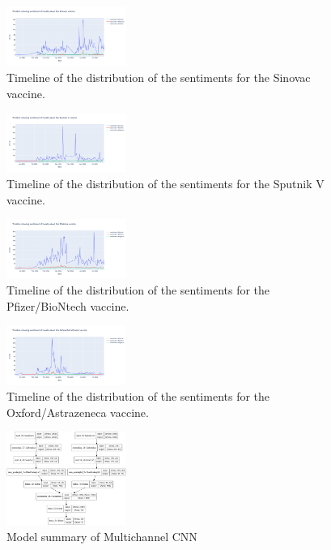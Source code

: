\documentclass[conference]{IEEEtran}
\begin{document}
\begin{figure}[h]
\centering
\includegraphics[width=0.35\textwidth]{sinovac.png}
\caption{Timeline of the distribution of the sentiments for the Sinovac vaccine.}
\label{fig:fig24}
\end{figure} 


\begin{figure}[h]
\centering
\includegraphics[width=0.35\textwidth]{sputnik.png}
\caption{Timeline of the distribution of the sentiments for the Sputnik V vaccine.}
\label{fig:fig25}
\end{figure} 


\begin{figure}[h]
\centering
\includegraphics[width=0.35\textwidth]{moderna.png}
\caption{Timeline of the distribution of the sentiments for the Pfizer/BioNtech vaccine.}
\label{fig:fig26}
\end{figure} 

\newpage
\begin{figure}[h]
\centering
\includegraphics[width=0.35\textwidth]{oxford.png}
\caption{Timeline of the distribution of the sentiments for the Oxford/Astrazeneca vaccine.}
\label{fig:fig27}
\end{figure} 

\begin{figure}[h]
\centering
\includegraphics[width=0.35\textwidth]{multichannelcnn.png}
\caption{Model summary of Multichannel CNN}
\label{fig:fig28}
\end{figure} 
\end{document}
